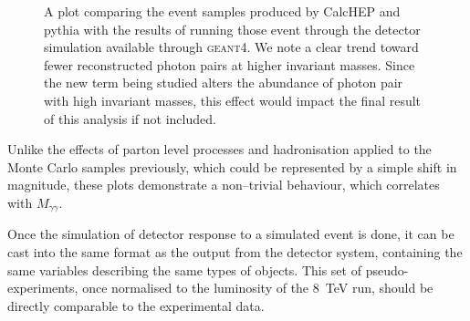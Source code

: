 \begin{figure}[htp]
\begin{minipage}[b]{.69\textwidth}
\begin{infilsf} \tiny

\end{infilsf}
\end{minipage}
\hfill\begin{minipage}[b]{.3\textwidth}
\caption{A plot comparing the event samples produced by CalcHEP and pythia with the results of running those event through the detector simulation available through \textsc{geant4}. We note a clear trend toward fewer reconstructed photon pairs at higher invariant masses. Since the new term being studied alters the abundance of photon pair with high invariant masses, this effect would impact the final result of this analysis if not included. \label{geant-beaf}}
\end{minipage}
\end{figure}

Unlike the effects of parton level processes and hadronisation applied to the Monte Carlo samples previously, which could be represented by a simple shift in magnitude, these plots demonstrate a non--trivial behaviour, which correlates with $M_{\gamma\gamma}$.

Once the simulation of detector response to a simulated event is done, it can be cast into the same format as the output from the detector system, containing the same variables describing the same types of objects. This set of pseudo-experiments, once normalised to the luminosity of the 8~TeV run, should be directly comparable to the experimental data.
